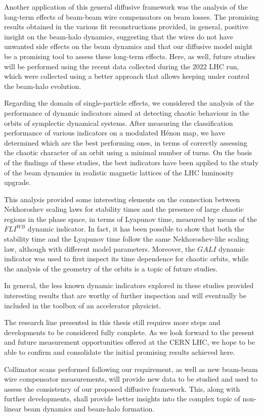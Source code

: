 Another application of this general diffusive framework was the analysis of the long-term effects of beam-beam wire compensators on beam losses. The promising results obtained in the various fit reconstructions provided, in general, positive insight on the beam-halo dynamics, suggesting that the wires do not have unwanted side effects on the beam dynamics and that our diffusive model might be a promising tool to assess these long-term effects. Here, as well, future studies will be performed using the recent data collected during the 2022 LHC run, which were collected using a better approach that allows keeping under control the beam-halo evolution.

Regarding the domain of single-particle effects, we considered the analysis of the performance of dynamic indicators aimed at detecting chaotic behaviour in the orbits of symplectic dynamical systems. After measuring the classification performance of various indicators on a modulated Hénon map, we have determined which are the best performing ones, in terms of correctly assessing the chaotic character of an orbit using a minimal number of turns. On the basis of the findings of these studies, the best indicators have been applied to the study of the beam dynamics in realistic magnetic lattices of the LHC luminosity upgrade.

This analysis provided some interesting elements on the connection between Nekhoroshev scaling laws for stability times and the presence of large chaotic regions in the phase space, in terms of Lyapunov time, measured by means of the $FLI^{WB}$ dynamic indicator. In fact, it has been possible to show that both the stability time and the Lyapunov time follow the same Nekhoroshev-like scaling law, although with different model parameters. Moreover, the $GALI$ dynamic indicator was used to first inspect its time dependence for chaotic orbits, while the analysis of the geometry of the orbits is a topic of future studies.

In general, the less known dynamic indicators explored in these studies provided interesting results that are worthy of further inspection and will eventually be included in the toolbox of an accelerator physicist.

The research line presented in this thesis still requires more steps and developments to be considered fully complete. As we look forward to the present and future measurement opportunities offered at the CERN LHC, we hope to be able to confirm and consolidate the initial promising results achieved here.

Collimator scans performed following our requirement, as well as new beam-beam wire compensator measurements, will provide new data to be studied and used to assess the consistency of our proposed diffusive framework. This, along with further developments, shall provide better insights into the complex topic of non-linear beam dynamics and beam-halo formation.


